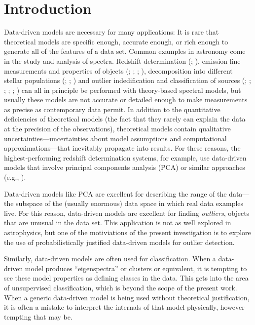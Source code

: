 \documentclass[12pt,preprint]{aastex}
\begin{document}
\section{Introduction}\label{sec:introduction}
Data-driven models are necessary for many applications: It is rare
that theoretical models are specific enough, accurate enough, or rich
enough to generate all of the features of a data set.  Common examples 
in astronomy come in the study and analysis of spectra.  Redshift
determination (\citealt{budavari}; \citealt{glazebrook}),
emission-line measurements and properties of objects (\citealt{allen}; 
\citealt{borosona}; \citealt{borosonc}; \citealt{wild}), 
decomposition into different stellar populations (\citealt{chen}; 
\citealt{ferreras}; \citealt{nolan}) and outlier indedification and
classification of sources (\citealt{borosona}; \citealt{connolly};
\citealt{francis}; \citealt{suzuki}; \citealt{yip}; \citealt{yipb}) can all in
principle be performed with theory-based spectral models, but usually these 
models are not accurate or detailed enough to make
measurements as precise as contemporary data permit.  In addition to
the quantitative deficiencies of theoretical models (the fact that
they rarely can explain the data at the precision of the
observations), theoretical models contain qualitative
uncertainties---uncertainties about model assumptions and
computational approximations---that inevitably propagate into results.
For these reasons, the highest-performing redshift determination
systems, for example, use data-driven models that involve principal
components analysis (PCA) or similar approaches (e.g., \citealt{sdssdr7}).

Data-driven models like PCA are excellent for describing the range of
the data---the subspace of the (usually enormous) data space in which
real data examples live.  For this reason, data-driven models are
excellent for finding \emph{outliers}, objects that are unusual in the
data set.  This application is not as well explored in astrophysics,
but one of the motiviations of the present investigation is to explore
the use of probabilistically justified data-driven models for outlier
detection.

Similarly, data-driven models are often used for classification.  When
a data-driven model produces ``eigenspectra'' or clusters or
equivalent, it is tempting to see these model properties as defining
classes in the data.  This gets into the area of unsupervised
classification, which is beyond the scope of the present work.  When a
generic data-driven model is being used without theoretical
justification, it is often a mistake to interpret the internals of
that model physically, however tempting that may be.
\end{document}
